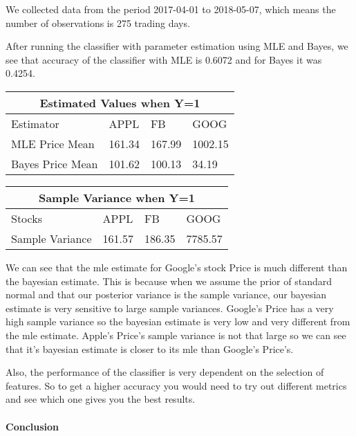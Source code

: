 \documentclass{article}
\begin{document}
We collected data from the period 2017-04-01 to 2018-05-07, which means the number of observations is 275 trading days.\newline

After running the classifier with parameter estimation using MLE and Bayes, we see that accuracy of the classifier with MLE is 0.6072 and for Bayes it was 0.4254.

\begin{center}
\begin{tabular}{|p{3cm}||p{1cm}|p{1cm}|p{1cm}|  }
 \hline
 \multicolumn{4}{|c|}{Estimated Values when Y=1} \\
 \hline
 Estimator & APPL & FB & GOOG\\
 \hline
 MLE Price Mean & 161.34 & 167.99 & 1002.15 \\
 \hline
 Bayes Price Mean & 101.62  & 100.13 & 34.19 \\
 \hline
\end{tabular}
\end{center}

\begin{center}
\begin{tabular}{|p{3cm}|p{1cm}|p{1cm}|p{1cm}|  }
 \hline
 \multicolumn{4}{|c|}{Sample Variance when Y=1} \\
 \hline
 Stocks & APPL & FB & GOOG\\
 \hline
 Sample Variance & 161.57 & 186.35 & 7785.57 \\
 \hline
\end{tabular}
\end{center}

\mbox{}\newline
We can see that the mle estimate for Google's stock Price is much different than the bayesian estimate. This is because when we assume the prior of standard normal and that our posterior variance is the sample variance, our bayesian estimate is very sensitive to large sample variances. Google's Price has a very high sample variance so the bayesian estimate is very low and very different from the mle estimate. Apple's Price's sample variance is not that large so we can see that it's bayesian estimate is closer to its mle than Google's Price's.

Also, the performance of the classifier is very dependent on the selection of features. So to get a higher accuracy you would need to try out different metrics and see which one gives you the best results.

\paragraph{Conclusion}\mbox{}\\
\end{document}
